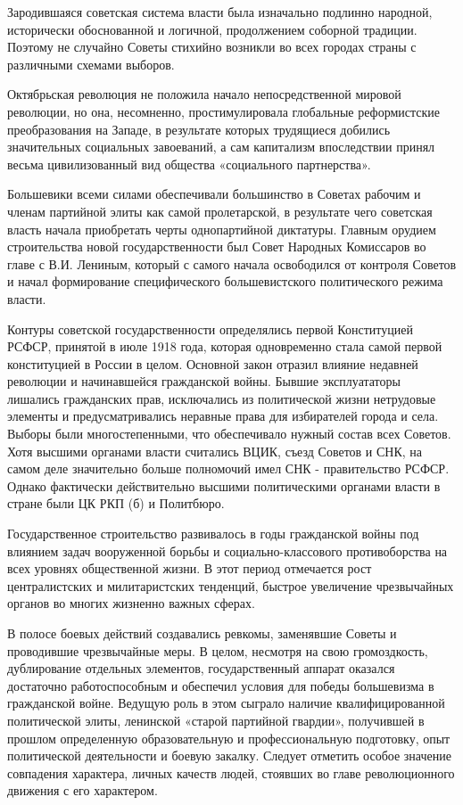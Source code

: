 \documentclass{article}
\begin{document}
\hfill

Зародившаяся советская система власти была изначально подлинно народной, исторически обоснованной и логичной, продолжением соборной традиции. Поэтому не случайно Советы стихийно возникли во всех городах страны с различными схемами выборов.

\hfill

Октябрьская революция не положила начало непосредственной мировой революции, но она, несомненно, простимулировала глобальные реформистские преобразования на Западе, в результате которых трудящиеся добились значительных социальных завоеваний, а сам капитализм впоследствии принял весьма цивилизованный вид общества «социального партнерства».

\hfill

Большевики всеми силами обеспечивали большинство в Советах рабочим и членам партийной элиты как самой пролетарской, в результате чего советская власть начала приобретать черты однопартийной диктатуры. Главным орудием строительства новой государственности был Совет Народных Комиссаров во главе с В.И. Лениным, который с самого начала освободился от контроля Советов и начал формирование специфического большевистского политического режима власти.

\hfill

Контуры советской государственности определялись первой Конституцией РСФСР, принятой в июле 1918 года, которая одновременно стала самой первой конституцией в России в целом. Основной закон отразил влияние недавней революции и начинавшейся гражданской войны. Бывшие эксплуататоры лишались гражданских прав, исключались из политической жизни нетрудовые элементы и предусматривались неравные права для избирателей города и села. Выборы были многостепенными, что обеспечивало нужный состав всех Советов. Хотя высшими органами власти считались ВЦИК, съезд Советов и СНК, на самом деле значительно больше полномочий имел СНК - правительство РСФСР. Однако фактически действительно высшими политическими органами власти в стране были ЦК РКП (б) и Политбюро.

\hfill

Государственное строительство развивалось в годы гражданской войны под влиянием задач вооруженной борьбы и социально-классового противоборства на всех уровнях общественной жизни. В этот период отмечается рост централистских и милитаристских тенденций, быстрое увеличение чрезвычайных органов во многих жизненно важных сферах.

\hfill

В полосе боевых действий создавались ревкомы, заменявшие Советы и проводившие чрезвычайные меры. В целом, несмотря на свою громоздкость, дублирование отдельных элементов, государственный аппарат оказался достаточно работоспособным и обеспечил условия для победы большевизма в гражданской войне. Ведущую роль в этом сыграло наличие квалифицированной политической элиты, ленинской «старой партийной гвардии», получившей в прошлом определенную образовательную и профессиональную подготовку, опыт политической деятельности и боевую закалку. Следует отметить особое значение совпадения характера, личных качеств людей, стоявших во главе революционного движения с его характером.
\end{document}
